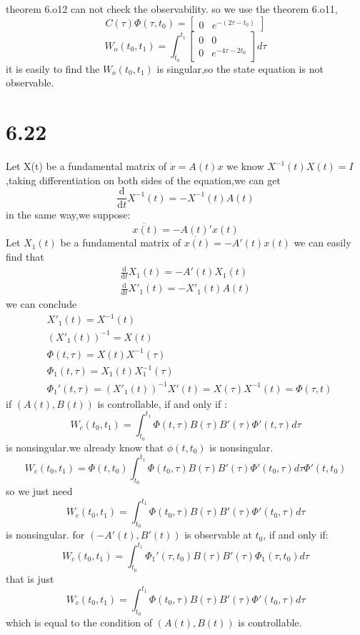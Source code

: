 \documentclass{article}
\begin{document}
theorem 6.o12 can not check the observability.
so we use the theorem 6.o11,
\[
C(\tau)\Phi(\tau,t_0)=
\left[
    \begin{array}{cc}
        0 & e^{-(2\tau-t_0)}
    \end{array}
\right]
\]
\[
W_o(t_0,t_1)=
\int_{t_0}^{t_1}
\left[
    \begin{array}{cc}
        0 & 0\\
        0 & e^{-4\tau-2t_0}
    \end{array}
\right]d\tau
\]
it is easily to find the $W_o(t_0,t_1)$ is singular,so the state equation is not observable. 

\section*{6.22}
Let X(t) be a fundamental matrix of $\dot{x}=A(t)x$
we know $X^{-1}(t)X(t)=I$,taking differentiation on both sides of the equation,we can get 
\[
    \frac{\mathrm{d}}{\mathrm{d}t}X^{-1}(t)=-X^{-1}(t)A(t) 
\]
in the same way,we suppose:
\[
\dot{x(t)}=-A(t)'x(t)    
\]
Let $X_1(t)$ be a fundamental matrix of $\dot{x(t)}=-A'(t)x(t)$
we can easily find that 
$$
\begin{aligned}
\frac{\mathrm{d}}{\mathrm{d}t}X_{1}(t)=-A'(t)X_{1}(t)\\
\frac{\mathrm{d}}{\mathrm{d}t}X'_{1}(t)=-X'_{1}(t)A(t)
\end{aligned}
$$ 
we can conclude 
$$
\begin{aligned}
&X'_{1}(t)=X^{-1}(t)\\
&(X'_1(t))^{-1}=X(t)\\
&\Phi(t,\tau)=X(t)X^{-1}(\tau)\\
&\Phi_1(t,\tau)=X_1(t)X_1^{-1}(\tau)\\
&\Phi_1'(t,\tau)=(X'_1(t))^{-1}X'(t)=X(\tau)X^{-1}(t)=\Phi(\tau,t)
\end{aligned}
$$
if $(A(t),B(t))$ is controllable, if and only if :\\
\[
W_c(t_0,t_1)=\int_{t_0}^{t_1}\Phi(t,\tau)B(\tau)B'(\tau)\Phi'(t,\tau)d\tau    
\] 
is nonsingular.we already know that $\phi(t,t_0)$ is nonsingular.
\[
W_c(t_0,t_1)=\Phi(t,t_0)\int_{t_0}^{t_1}\Phi(t_0,\tau)B(\tau)B'(\tau)\Phi'(t_0,\tau)d\tau \Phi'(t,t_0)     
\]
so we just need 
\[
W_c(t_0,t_1)=\int_{t_0}^{t_1}\Phi(t_0,\tau)B(\tau)B'(\tau)\Phi'(t_0,\tau)d\tau     
\]
is nonsingular.
for $(-A'(t),B'(t))$ is observable at $t_0$, if and only if:
\[
W_c(t_0,t_1)=\int_{t_0}^{t_1}\Phi_1'(\tau,t_0)B(\tau)B'(\tau)\Phi_1(\tau,t_0)d\tau    
\]
that is just 
\[
W_c(t_0,t_1)=\int_{t_0}^{t_1}\Phi(t_0,\tau)B(\tau)B'(\tau)\Phi'(t_0,\tau)d\tau    
\] 
which is equal to the condition of $(A(t),B(t))$ is controllable.
\end{document}
